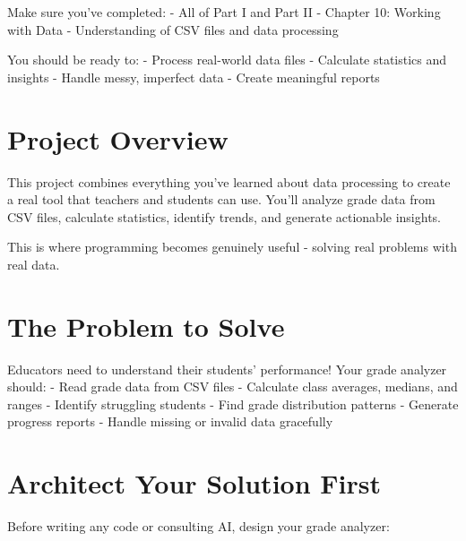 \documentclass[
  letterpaper,
  DIV=11,
  numbers=noendperiod,
  oneside]{scrreprt}
\begin{document}
\begin{tcolorbox}[enhanced jigsaw, opacityback=0, colback=white, colframe=quarto-callout-important-color-frame, breakable, titlerule=0mm, coltitle=black, rightrule=.15mm, colbacktitle=quarto-callout-important-color!10!white, left=2mm, bottomtitle=1mm, bottomrule=.15mm, title=\textcolor{quarto-callout-important-color}{\faExclamation}\hspace{0.5em}{Before You Start}, opacitybacktitle=0.6, toptitle=1mm, leftrule=.75mm, arc=.35mm, toprule=.15mm]

Make sure you've completed: - All of Part I and Part II - Chapter 10:
Working with Data - Understanding of CSV files and data processing

You should be ready to: - Process real-world data files - Calculate
statistics and insights - Handle messy, imperfect data - Create
meaningful reports

\end{tcolorbox}

\section{Project Overview}\label{project-overview-8}

This project combines everything you've learned about data processing to
create a real tool that teachers and students can use. You'll analyze
grade data from CSV files, calculate statistics, identify trends, and
generate actionable insights.

This is where programming becomes genuinely useful - solving real
problems with real data.

\section{The Problem to Solve}\label{the-problem-to-solve-8}

Educators need to understand their students' performance! Your grade
analyzer should: - Read grade data from CSV files - Calculate class
averages, medians, and ranges - Identify struggling students - Find
grade distribution patterns - Generate progress reports - Handle missing
or invalid data gracefully

\section{Architect Your Solution
First}\label{architect-your-solution-first-8}

Before writing any code or consulting AI, design your grade analyzer:
\end{document}
